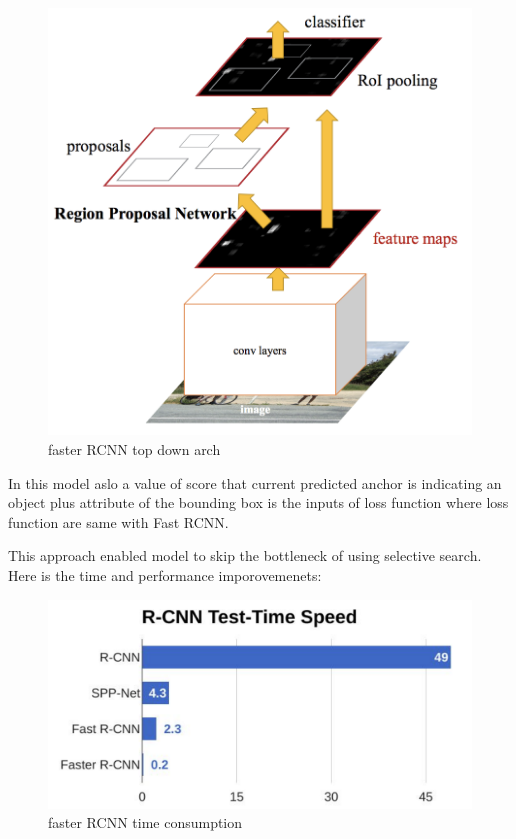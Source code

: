 \documentclass[11pt]{article}
\makeatletter
\def\maxwidth{\ifdim\Gin@nat@width>\linewidth\linewidth
    \else\Gin@nat@width\fi}
\let\Oldincludegraphics\includegraphics
\renewcommand{\includegraphics}[1]{\Oldincludegraphics[width=.8\maxwidth]{#1}}
\makeatother
\begin{document}
\begin{figure}
\centering
\includegraphics{wiki/faster2.png}
\caption{faster RCNN top down arch}
\end{figure}

In this model aslo a value of score that current predicted anchor is
indicating an object plus attribute of the bounding box is the inputs of
loss function where loss function are same with Fast RCNN.

This approach enabled model to skip the bottleneck of using selective
search. Here is the time and performance imporovemenets:

\begin{figure}
\centering
\includegraphics{wiki/faster3.png}
\caption{faster RCNN time consumption}
\end{figure}
\end{document}
